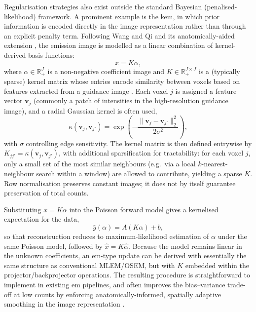 Regularisation strategies also exist outside the standard Bayesian (penalised-likelihood) framework. A prominent example is the \gls{kem}, in which prior information is encoded directly in the image representation rather than through an explicit penalty term. Following Wang and Qi \cite{wangPETImageReconstruction2015} and its anatomically-aided extension \cite{hutchcroftAnatomicallyaidedPETReconstruction2016}, the emission image is modelled as a linear combination of kernel-derived basis functions:
\begin{equation}
    x = K\alpha,
    \label{eq:kernel1}
\end{equation}
where $\alpha \in \mathbb{R}_+^J$ is a non-negative coefficient image and $K\in\mathbb{R}_+^{J\times J}$ is a (typically sparse) kernel matrix whose entries encode similarity between voxels based on features extracted from a guidance image \cite{hutchcroftAnatomicallyaidedPETReconstruction2016}. Each voxel $j$ is assigned a feature vector $\mathbf v_j$ (commonly a patch of intensities in the high-resolution guidance image), and a radial Gaussian kernel is often used,
\begin{equation} \label{eq:gaussian_kernel}
    \kappa(\mathbf v_j,\mathbf v_{j'})=
    \exp\!\left(-\frac{\|\mathbf v_j-\mathbf v_{j'}\|_2^2}{2\sigma^2}\right),
\end{equation}
with $\sigma$ controlling edge sensitivity. The kernel matrix is then defined entrywise by $K_{j j'}=\kappa(\mathbf v_j,\mathbf v_{j'})$, with additional sparsification for tractability: for each voxel $j$, only a small set of the most similar neighbours (e.g.\ via a local $k$-nearest-neighbour search within a window) are allowed to contribute, yielding a sparse $K$. Row normalisation preserves constant images; it does not by itself guarantee preservation of total counts.

Substituting $x=K\alpha$ into the Poisson forward model gives a kernelised expectation for the data,
\begin{equation}
    \bar{y}(\alpha) = A(K\alpha) + b,
\end{equation}
so that reconstruction reduces to maximum-likelihood estimation of $\alpha$ under the same Poisson model, followed by $\hat{x}=K\hat{\alpha}$. Because the model remains linear in the unknown coefficients, an \gls{em}-type update can be derived with essentially the same structure as conventional MLEM/OSEM, but with $K$ embedded within the projector/backprojector operations. The resulting procedure is straightforward to implement in existing \gls{em} pipelines, and often improves the bias--variance trade-off at low counts by enforcing anatomically-informed, spatially adaptive smoothing in the image representation \cite{wangPETImageReconstruction2015,hutchcroftAnatomicallyaidedPETReconstruction2016}.

